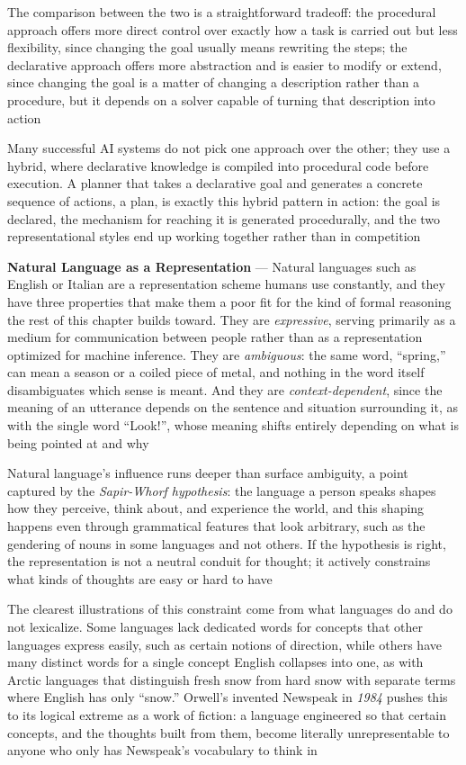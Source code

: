 The comparison between the two is a straightforward tradeoff: the
procedural approach offers more direct control over exactly how a task is
carried out but less flexibility, since changing the goal usually means
rewriting the steps; the declarative approach offers more abstraction and is
easier to modify or extend, since changing the goal is a matter of changing
a description rather than a procedure, but it depends on a solver capable
of turning that description into action

Many successful AI systems do not pick one approach over the other; they
use a hybrid, where declarative knowledge is compiled into procedural code
before execution. A planner that takes a declarative goal and generates a
concrete sequence of actions, a plan, is exactly this hybrid pattern in
action: the goal is declared, the mechanism for reaching it is generated
procedurally, and the two representational styles end up working together
rather than in competition

\textbf{Natural Language as a Representation} --- Natural languages such as
English or Italian are a representation scheme humans use constantly, and
they have three properties that make them a poor fit for the kind of formal
reasoning the rest of this chapter builds toward. They are \emph{expressive},
serving primarily as a medium for communication between people rather than
as a representation optimized for machine inference. They are
\emph{ambiguous}: the same word, ``spring,'' can mean a season or a coiled
piece of metal, and nothing in the word itself disambiguates which sense is
meant. And they are \emph{context-dependent}, since the meaning of an
utterance depends on the sentence and situation surrounding it, as with the
single word ``Look!'', whose meaning shifts entirely depending on what is
being pointed at and why

Natural language's influence runs deeper than surface ambiguity, a point
captured by the \emph{Sapir-Whorf hypothesis}: the language a person speaks
shapes how they perceive, think about, and experience the world, and this
shaping happens even through grammatical features that look arbitrary, such
as the gendering of nouns in some languages and not others. If the
hypothesis is right, the representation is not a neutral conduit for
thought; it actively constrains what kinds of thoughts are easy or hard to
have

The clearest illustrations of this constraint come from what languages do
and do not lexicalize. Some languages lack dedicated words for concepts
that other languages express easily, such as certain notions of direction,
while others have many distinct words for a single concept English
collapses into one, as with Arctic languages that distinguish fresh snow
from hard snow with separate terms where English has only ``snow.''
Orwell's invented Newspeak in \emph{1984} pushes this to its logical
extreme as a work of fiction: a language engineered so that certain
concepts, and the thoughts built from them, become literally
unrepresentable to anyone who only has Newspeak's vocabulary to think in

